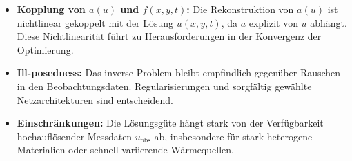 \begin{itemize}
	\item \textbf{Kopplung von \(a(u)\) und \(f(x, y, t)\):}  
	Die Rekonstruktion von \(a(u)\) ist nichtlinear gekoppelt mit der Lösung \(u(x, y, t)\), da \(a\) explizit von \(u\) abhängt. Diese Nichtlinearität führt zu Herausforderungen in der Konvergenz der Optimierung.
	\item \textbf{Ill-posedness:}  
	Das inverse Problem bleibt empfindlich gegenüber Rauschen in den Beobachtungsdaten. Regularisierungen und sorgfältig gewählte Netzarchitekturen sind entscheidend.
	\item \textbf{Einschränkungen:}  
	Die Lösungsgüte hängt stark von der Verfügbarkeit hochauflösender Messdaten \(u_\text{obs}\) ab, insbesondere für stark heterogene Materialien oder schnell variierende Wärmequellen.
\end{itemize}

